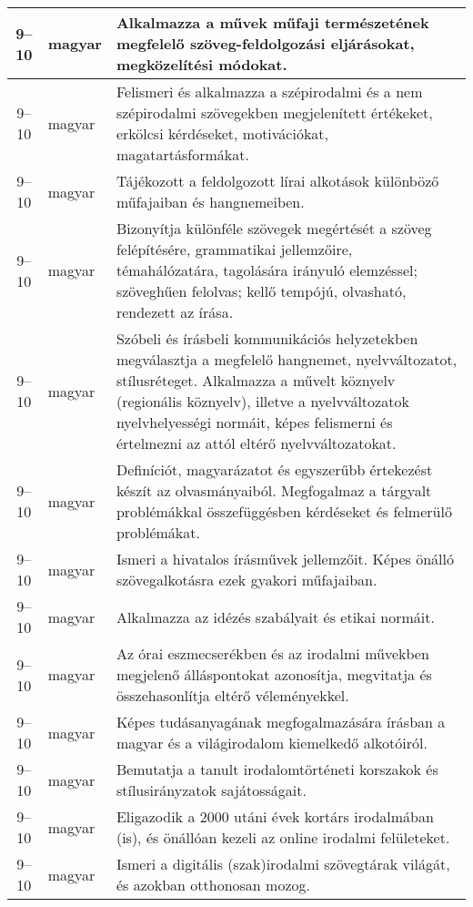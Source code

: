 \begin{small}
\begin{longtable}{c | p{2cm} |  p{11cm} }
              9--10 & magyar & Alkalmazza a művek műfaji természetének megfelelő szöveg-feldolgozási eljárásokat, megközelítési módokat. \\ \hline
              9--10 & magyar & Felismeri és alkalmazza a szépirodalmi és a nem szépirodalmi szövegekben megjelenített értékeket, erkölcsi kérdéseket, motivációkat, magatartásformákat. \\ \hline
              9--10 & magyar & Tájékozott a feldolgozott lírai alkotások különböző műfajaiban és hangnemeiben. \\ \hline
              9--10 & magyar & Bizonyítja különféle szövegek megértését a szöveg felépítésére, grammatikai jellemzőire, témahálózatára, tagolására irányuló elemzéssel; szöveghűen felolvas; kellő tempójú, olvasható, rendezett az írása.  \\ \hline
              9--10 & magyar & Szóbeli és írásbeli kommunikációs helyzetekben megválasztja a megfelelő hangnemet, nyelvváltozatot, stílusréteget. Alkalmazza a művelt köznyelv (regionális köznyelv), illetve a nyelvváltozatok nyelvhelyességi normáit, képes felismerni és értelmezni az attól eltérő nyelvváltozatokat. \\ \hline
              9--10 & magyar & Definíciót, magyarázatot és egyszerűbb értekezést készít az olvasmányaiból. Megfogalmaz a tárgyalt problémákkal összefüggésben kérdéseket és felmerülő problémákat. \\ \hline
              9--10 & magyar & Ismeri a hivatalos írásművek jellemzőit. Képes önálló szövegalkotásra ezek gyakori műfajaiban. \\ \hline
              9--10 & magyar & Alkalmazza az idézés szabályait és etikai normáit. \\ \hline
              9--10 & magyar & Az órai eszmecserékben és az irodalmi művekben megjelenő álláspontokat azonosítja, megvitatja és összehasonlítja eltérő véleményekkel. \\ \hline
              9--10 & magyar & Képes tudásanyagának megfogalmazására írásban a magyar és a világirodalom kiemelkedő alkotóiról. \\ \hline
              9--10 & magyar & Bemutatja a tanult irodalomtörténeti korszakok és stílusirányzatok sajátosságait. \\ \hline
              9--10 & magyar & Eligazodik a 2000 utáni évek kortárs irodalmában (is), és önállóan kezeli az online irodalmi felületeket. \\ \hline
              9--10 & magyar & Ismeri a digitális (szak)irodalmi szövegtárak világát, és azokban otthonosan mozog. \\ \hline

\end{longtable}
\end{small}
